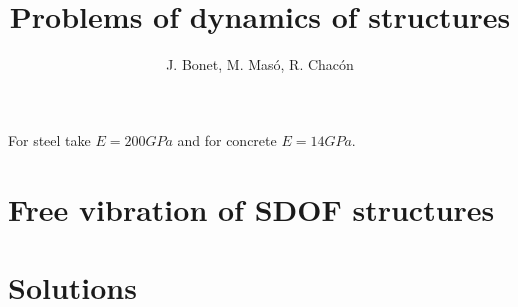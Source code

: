 \documentclass{problems}
\title{Problems of dynamics of structures}
\author{J. Bonet, M. Masó, R. Chacón}
\begin{document}
\maketitle

For steel take $E=200GPa$ and for concrete $E=14GPa$.

\section{Free vibration of SDOF structures}







\newpage
\section{Solutions}





\printbibliography
\end{document}
